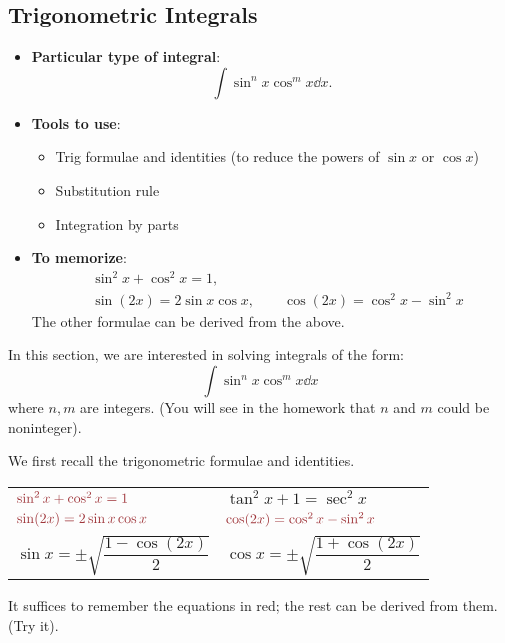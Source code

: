 \subsection{Trigonometric Integrals} 
\begin{center}
\begin{tcolorbox}
    \begin{itemize}
        \item \textbf{Particular type of integral}: \[\int \sin^n x \cos^m x \dd x.\]
        \item \textbf{Tools to use}: 
        \begin{itemize}
            \item Trig formulae and identities (to reduce the powers of $\sin x$ or $\cos x$)
            \item Substitution rule
            \item Integration by parts
        \end{itemize}
        \item \textbf{To memorize}:
        \begin{align*}
            &\sin^2 x + \cos^2 x = 1, \\
            &\sin(2x) = 2\sin x \cos x,  \qquad \cos(2x) = \cos^2 x - \sin^2 x
        \end{align*}
        The other formulae can be derived from the above.
    \end{itemize}
\end{tcolorbox}
\end{center}

In this section, we are interested in solving integrals of the form: 
\[\int \sin^n x \cos^m x \dd x\]
where $n, m$ are integers. (You will see in the homework that $n$ and $m$ could be noninteger).

We first recall the trigonometric formulae and identities. 
\begin{center}
    \renewcommand{\arraystretch}{2.5}
    \begin{tabular}{  p{} p{}  }
        $\red{\sin^2 x + \cos^2 x = 1}$ & $\tan^2 x + 1 = \sec^2 x$ \\
        $ \red{\sin(2x) = 2\sin x \cos x} $ & $ \red{\cos(2x) = \cos^2 x - \sin^2 x} $ \\
        $\displaystyle \sin x = \pm\sqrt{\dfrac{1 - \cos (2x)}{2}} $ & $\displaystyle \cos x = \pm\sqrt{\dfrac{1 + \cos (2x)}{2}} $
    \end{tabular}
\end{center}
It suffices to remember the equations in red; the rest can be derived from them. (Try it).


